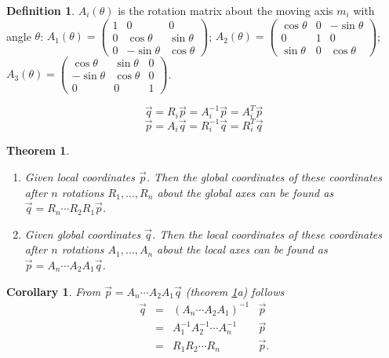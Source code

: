 \documentclass{article}
\newtheorem{theorem}{Theorem}[section]
\newtheorem{corollary}{Corollary}[section]
\theoremstyle{definition}
\newtheorem{definition}{Definition}[section]
\begin{document}
\begin{definition}
$A_i(\theta)$ is the rotation matrix about the moving axis $m_i$ with angle $\theta$:\newline
$A_1(\theta) = 
\begin{pmatrix}
1 & 0 & 0 \\
0 & \cos \theta & \sin \theta \\
0 & -\sin \theta & \cos \theta
\end{pmatrix}$; 
$A_2(\theta) = 
\begin{pmatrix}
\cos \theta & 0 & -\sin \theta \\
0 & 1 & 0 \\
\sin \theta & 0 & \cos \theta
\end{pmatrix}$;\newline
$A_3(\theta) = 
\begin{pmatrix}
\cos \theta & \sin \theta & 0 \\
-\sin \theta & \cos \theta & 0 \\
0 & 0 & 1
\end{pmatrix}$.
\end{definition}

\begin{equation*}
\vec{q} = R_i \vec{p} = A_i^{-1}\vec{p} = A_i^T \vec{p}
\end{equation*}
\begin{equation*}
\vec{p} = A_i \vec{q} = R_i^{-1}\vec{q} = R_i^T \vec{q}
\end{equation*}

\begin{theorem}\label{thm_succesive-rotation}\hfill
\begin{enumerate}[{(a)}]
\item Given local coordinates $\vec{p}$. Then the global coordinates of these coordinates after $n$ rotations $R_1, ..., R_n$ about the global axes can be found as $\vec{q} = R_n \cdots R_2 R_1 \vec{p}$.\newline
\item Given global coordinates $\vec{q}$. Then the local coordinates of these coordinates after $n$ rotations $A_1, ..., A_n$ about the local axes can be found as $\vec{p} = A_n \cdots A_2 A_1 \vec{q}$.\newline
\end{enumerate}
\end{theorem}

\begin{corollary}
From $\vec{p} = A_n \cdots A_2 A_1 \vec{q}$ (theorem \ref{thm_succesive-rotation}a) follows \newline
\begin{equation*}
\begin{array}{lcrl}
\vec{q} & = & \left( A_n \cdots A_2 A_1 \right)^{-1} & \vec{p} \\
& = & A_1^{-1} A_2^{-1} \cdots A_n^{-1} & \vec{p} \\
& = & R_1 R_2 \cdots R_n & \vec{p}.
\end{array}
\end{equation*}
\end{corollary}
\end{document}
